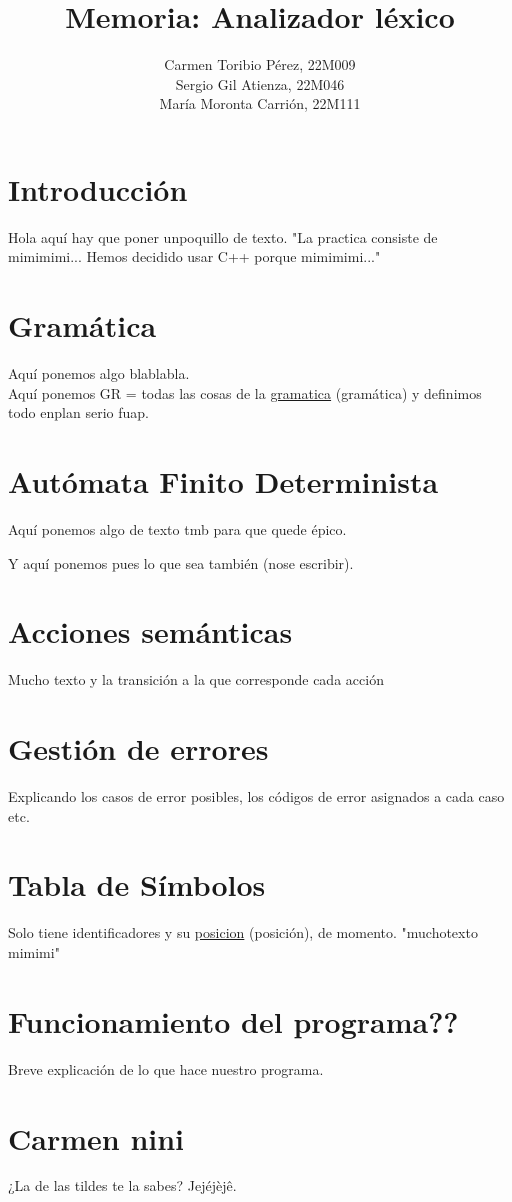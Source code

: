 \documentclass{article}
\title{\textbf{Memoria: Analizador léxico}}
\author{Carmen Toribio Pérez, 22M009\\Sergio Gil Atienza, 22M046\\María Moronta Carrión, 22M111}
\date{}
\begin{document}
\maketitle

\section{Introducción}
Hola aquí hay que poner unpoquillo de texto. "La practica consiste de mimimimi... Hemos decidido usar C++ porque mimimimi..."

\section{Gramática}
Aquí ponemos algo blablabla. \\
Aquí ponemos GR = {todas las cosas de la \underline{gramatica} (gramática)} y definimos todo enplan serio fuap.

\section{Autómata Finito Determinista}
Aquí ponemos algo de texto tmb para que quede épico.



Y aquí ponemos pues lo que sea también (nose escribir).

\section{Acciones semánticas}
Mucho texto y la transición a la que corresponde cada acción

\section{Gestión de errores}
Explicando los casos de error posibles, los códigos de error asignados a cada caso etc.

\section{Tabla de Símbolos}
Solo tiene identificadores y su \underline{posicion} (posición), de momento. "muchotexto mimimi"

\section{Funcionamiento del programa??}
Breve explicación de lo que hace nuestro programa.

\section{Carmen nini}
¿La de las tildes te la sabes? Jejéjèjê.
\end{document}
